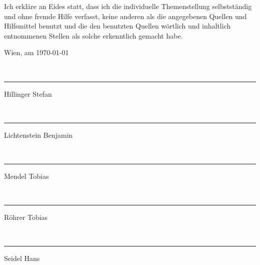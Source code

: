 
Ich erkläre an Eides statt, dass ich die individuelle Themenstellung
selbstständig und ohne fremde Hilfe verfasst, keine anderen als die
angegebenen Quellen und Hilfsmittel benutzt und die den benutzten
Quellen wörtlich und inhaltlich entnommenen Stellen als solche erkenntlich
gemacht habe.

\begin{flushleft}
\bigskip{}
Wien, am \today \\
\newcommand{\namesigdate}[2][8cm]{
\vspace{2cm}~\newline
\parbox{#1}{\hrule\centering #2\Large\strut}
\hfill
}
\namesigdate{Hillinger Stefan}
\namesigdate{Lichtenstein Benjamin}
\namesigdate{Mendel Tobias}
\namesigdate{Röhrer Tobias}
\namesigdate{Seidel Hans}
\par\end{flushleft}

